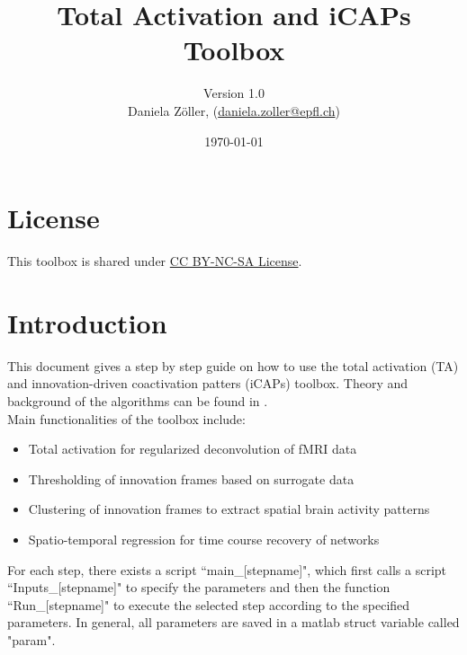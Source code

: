 \documentclass{article}
\newcommand{\texcountinc}{%
  \immediate\write18{texcount -inc \jobname.tex > \jobname.wcdetail }%
}
\begin{document}

\title{Total Activation and iCAPs Toolbox}
\author{Version 1.0\\Daniela Zöller, (\href{daniela.zoller@epfl.ch}{daniela.zoller@epfl.ch})}
\date{\today}

\maketitle

\tableofcontents


\section{License}
This toolbox is shared under \href{https://creativecommons.org/licenses/by-nc-sa/4.0/}{CC BY-NC-SA License}.

\section{Introduction}
This document gives a step by step guide on how to use the total activation (TA) and innovation-driven coactivation patters (iCAPs) toolbox. Theory and background of the algorithms can be found in \cite{Karahanoglu2011,Karahanoglu2013,Karahanoglu2015,Farouj2017,Zoller2018}.\\
Main functionalities of the toolbox include:
\begin{itemize}
\item Total activation for regularized deconvolution of fMRI data
\item Thresholding of innovation frames based on surrogate data
\item Clustering of innovation frames to extract spatial brain activity patterns
\item Spatio-temporal regression for time course recovery of networks
\end{itemize}

For each step, there exists a script ``main\_[stepname]", which first calls a script ``Inputs\_[stepname]" to specify the parameters and then the function ``Run\_[stepname]" to execute the selected step according to the specified parameters. In general, all parameters are saved in a matlab struct variable called "param".
\end{document}
